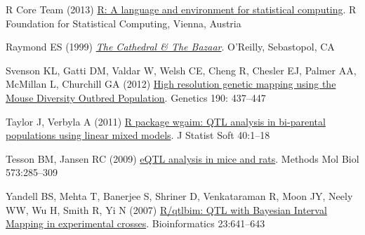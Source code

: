 \documentclass[letterpaper]{article}
\newenvironment{hanging}
{\begin{list}{}
        {\setlength{\labelwidth}{0in}
         \setlength{\leftmargin}{1em}
         \setlength{\itemindent}{-1em}
         \setlength{\parsep}{0in}
         \setlength{\itemsep}{0in}
        }
}
{\end{list}}
\begin{document}
\begin{multicols}{2}
\begin{hanging}
\item R Core Team (2013) \href{http://www.r-project.org}{R: A language
  and environment for statistical computing}.  R Foundation for
  Statistical Computing, Vienna, Austria

\item Raymond ES (1999)
  \href{http://www.catb.org/esr/writings/homesteading/cathedral-bazaar/}{\emph{The
      Cathedral \& The Bazaar}}. O'Reilly, Sebastopol, CA

\item Svenson KL, Gatti DM, Valdar W, Welsh CE, Cheng R, Chesler EJ,
  Palmer AA, McMillan L, Churchill GA (2012)
  \href{http://www.ncbi.nlm.nih.gov/pubmed/22345611}{High resolution
    genetic mapping using the Mouse Diversity Outbred
    Population}. Genetics 190: 437--447

\item Taylor J, Verbyla A (2011)
  \href{http://www.jstatsoft.org/v40/i07/}{R package wgaim: QTL
    analysis in bi-parental populations using linear mixed models}. J
  Statist Soft 40:1--18

\item Tesson BM, Jansen RC (2009)
  \href{http://www.ncbi.nlm.nih.gov/pubmed/19763934}{eQTL analysis in
    mice and rats}. Methods Mol Biol 573:285--309

\item Yandell BS, Mehta T, Banerjee S, Shriner D, Venkataraman R, Moon
  JY, Neely WW, Wu H, Smith R, Yi N (2007)
  \href{http://www.ncbi.nlm.nih.gov/pubmed/17237038}{R/qtlbim: QTL
    with Bayesian Interval Mapping in experimental
    crosses}. Bioinformatics 23:641--643


\end{hanging}

\end{multicols}
\end{document}
